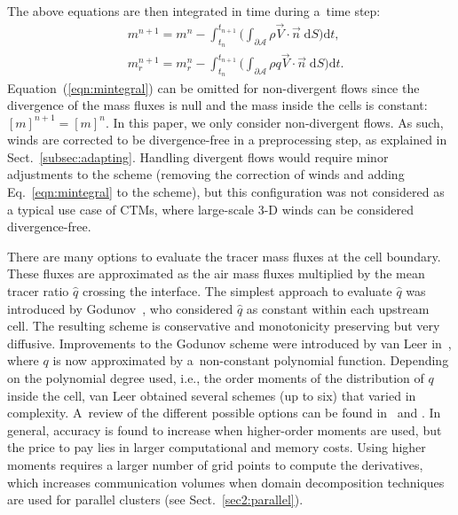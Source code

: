      The above equations are then integrated in time during
     a~time step:
     \begin{align}
       &m^{n+1} = m^{n} - \int_{t_n}^{t_{n+1}}
       \Big( \int_{\partial \mathcal{A}} \rho \vec{V}\cdot\vec{n}\;\mathrm{d}S \Big) \mathrm{d}t,
       \label{eqn:mintegral}
       \\
       &m_r^{n+1} = m_r^{n} - \int_{t_n}^{t_{n+1}}
       \Big( \int_{\partial \mathcal{A}} \rho q \vec{V}\cdot\vec{n}\;\mathrm{d}S \Big) \mathrm{d}t.
       \label{eqn:qintegral}
   \end{align}
   Equation~(\ref{eqn:mintegral}) can be omitted for non-divergent flows since
   the divergence of the mass fluxes is null and the mass inside the cells is
   constant: $[m]^{n+1} = [m]^{n}$. In this paper, we only consider
   non-divergent flows. As such, winds are corrected to be divergence-free in a
   preprocessing step, as explained in Sect.~\ref{subsec:adapting}.  Handling
   divergent flows would require minor adjustments to the scheme (removing the
   correction of winds and adding Eq.~\eqref{eqn:mintegral} to the scheme), but
   this configuration was not considered as a typical use case of CTMs, where
   large-scale 3-D winds can be considered divergence-free.

   There are many options to evaluate the tracer mass fluxes at the
   cell boundary. These fluxes are approximated as the air mass fluxes
   multiplied by the mean tracer ratio $\widehat{q}$ crossing the
   interface. The simplest approach to evaluate $\widehat{q}$ was
   introduced by Godunov~\citep{Godunov1961}, who considered $\widehat{q}$
   as constant within each upstream cell. The resulting scheme is
   conservative and monotonicity preserving but very diffusive. Improvements to the
   Godunov scheme were introduced by van Leer
   in~\citet{Leer1977}, where $q$ is now approximated by
   a~non-constant polynomial function. Depending on the polynomial
   degree used, i.e., the order moments of the distribution of $q$
   inside the cell, van Leer obtained several schemes (up to six) that
   varied in complexity. A~review of the different possible options
   can be found in~\citet{Rood1987} and \citet{Hourdin1999}.  In
   general, accuracy is found to increase when higher-order moments
   are used, but the price to pay lies in larger computational and
   memory costs. Using higher moments requires a larger number of
   grid points to compute the derivatives, which increases communication volumes
   when domain decomposition techniques are used for parallel clusters (see
   Sect.~\ref{sec2:parallel}).


